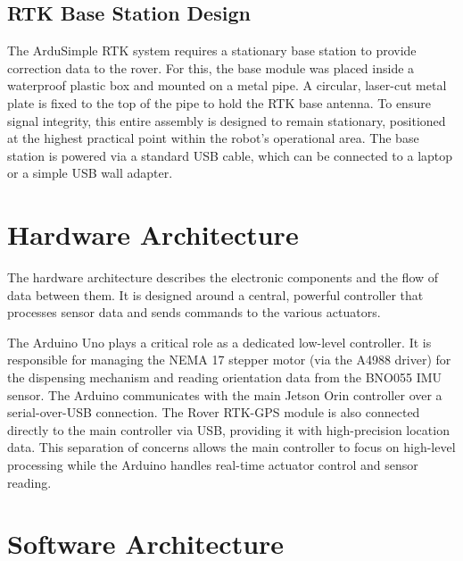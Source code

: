 \subsection{RTK Base Station Design}
\label{ssec:rtk_base_design}
The ArduSimple RTK system requires a stationary base station to provide correction data to the rover. For this, the base module was placed inside a waterproof plastic box and mounted on a metal pipe. A circular, laser-cut metal plate is fixed to the top of the pipe to hold the RTK base antenna. To ensure signal integrity, this entire assembly is designed to remain stationary, positioned at the highest practical point within the robot's operational area. The base station is powered via a standard USB cable, which can be connected to a laptop or a simple USB wall adapter.

\section{Hardware Architecture}
\label{sec:hardware_architecture}
The hardware architecture describes the electronic components and the flow of data between them. It is designed around a central, powerful controller that processes sensor data and sends commands to the various actuators.

The Arduino Uno plays a critical role as a dedicated low-level controller. It is responsible for managing the NEMA 17 stepper motor (via the A4988 driver) for the dispensing mechanism and reading orientation data from the BNO055 IMU sensor. The Arduino communicates with the main Jetson Orin controller over a serial-over-USB connection. The Rover RTK-GPS module is also connected directly to the main controller via USB, providing it with high-precision location data. This separation of concerns allows the main controller to focus on high-level processing while the Arduino handles real-time actuator control and sensor reading.

\section{Software Architecture}
\label{sec:software_architecture}
